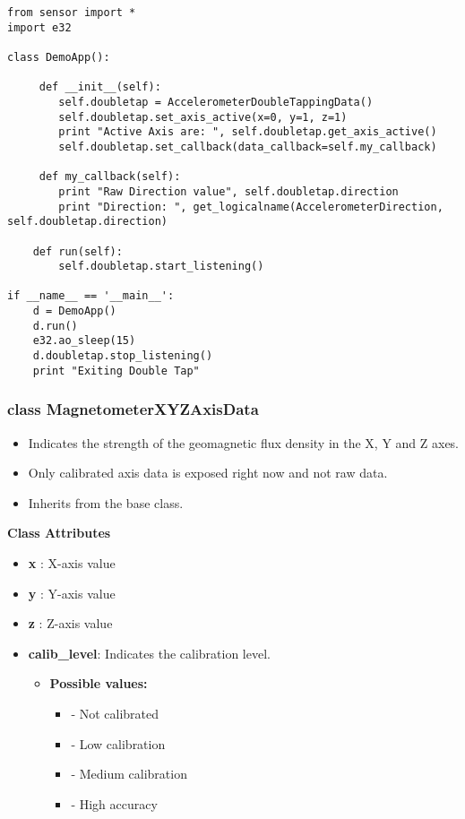 \begin{verbatim}
from sensor import *
import e32

class DemoApp():

     def __init__(self):
        self.doubletap = AccelerometerDoubleTappingData()
        self.doubletap.set_axis_active(x=0, y=1, z=1)
        print "Active Axis are: ", self.doubletap.get_axis_active()
        self.doubletap.set_callback(data_callback=self.my_callback)

     def my_callback(self):
        print "Raw Direction value", self.doubletap.direction
        print "Direction: ", get_logicalname(AccelerometerDirection, self.doubletap.direction)

    def run(self):
        self.doubletap.start_listening()

if __name__ == '__main__':
    d = DemoApp()
    d.run()
    e32.ao_sleep(15)
    d.doubletap.stop_listening()
    print "Exiting Double Tap"
\end{verbatim}

\subsubsection{class MagnetometerXYZAxisData}

\begin{itemize}
\item Indicates the strength of the geomagnetic flux density in the X, Y and Z axes.
\item Only calibrated axis data is exposed right now and not raw data.
\item Inherits from the  base class.
\end{itemize}

{\bf Class Attributes} \break

\begin{itemize}
\item {\bf x} : X-axis value
\item {\bf y} : Y-axis value
\item {\bf z} : Z-axis value
\item {\bf calib_level}: Indicates the calibration level.
\begin{itemize}
\item {\bf Possible values:}
\begin{itemize}
\item {} - Not calibrated
\item {} - Low calibration
\item {} - Medium calibration
\item {} - High accuracy
\end{itemize}
\end{itemize}
\end{itemize}

